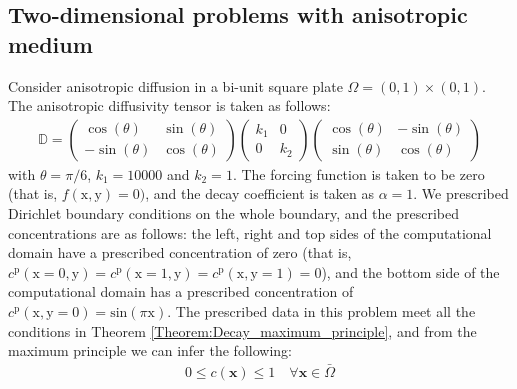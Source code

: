 \documentclass[11pt]{amsart}
\begin{document}
\subsection{Two-dimensional problems with anisotropic medium}
Consider anisotropic diffusion in a bi-unit square plate $\Omega = (0, 1) \times (0, 1)$. 
The anisotropic diffusivity tensor is taken as follows:
\begin{align}
  \label{Eqn:Decay_diffusivity_tensor_homogeneous}
  \mathbb{D} = 
  \left(\begin{array}{cc}
      \cos(\theta) & \sin(\theta) \\ 
      -\sin(\theta) & \cos(\theta)
    \end{array}\right)
\left(\begin{array}{cc}
      k_1 & 0 \\ 
      0 & k_2
    \end{array}\right)
\left(\begin{array}{cc}
      \cos(\theta) & -\sin(\theta) \\ 
      \sin(\theta) & \cos(\theta)
    \end{array}\right)
\end{align}
with $\theta = \pi/6$, $k_1 = 10000$ and $k_2 = 1$. The forcing function is taken to 
be zero (that is, $f(\mathrm{x}, \mathrm{y}) = 0)$, and the decay coefficient is taken 
as $\alpha = 1$. We prescribed Dirichlet boundary conditions on the whole boundary, and 
the prescribed concentrations are as follows: the left, right and top sides of the 
computational domain have a prescribed concentration of zero (that is, $c^{\mathrm{p}}
(\mathrm{x} = 0,\mathrm{y}) = c^{\mathrm{p}}(\mathrm{x} = 1, \mathrm{y}) = c^{\mathrm{p}}
(\mathrm{x}, \mathrm{y} = 1)=0$), and the bottom side of the computational domain has 
a prescribed concentration of $c^{\mathrm{p}}(\mathrm{x},\mathrm{y} = 0) = \mathrm{sin}
(\pi \mathrm{x})$. The prescribed data in this problem meet all the conditions in Theorem 
\ref{Theorem:Decay_maximum_principle}, and from the maximum principle we can infer the 
following:
\begin{align}
  0 \leq c(\mathbf{x}) \leq 1 \quad \forall \mathbf{x} \in \bar{\Omega}
\end{align}
\end{document}
